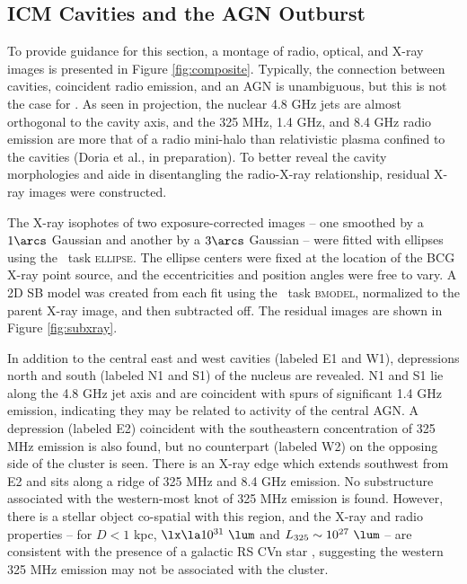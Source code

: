 \documentclass{emulateapj}
\begin{document}
\subsection{ICM Cavities and the AGN Outburst}
\label{sec:cavities}

To provide guidance for this section, a montage of radio, optical, and
X-ray images is presented in Figure \ref{fig:composite}. Typically,
the connection between cavities, coincident radio emission, and an AGN
is unambiguous, but this is not the case for \rxj. As seen in
projection, the nuclear 4.8 GHz jets are almost orthogonal to the
cavity axis, and the 325 MHz, 1.4 GHz, and 8.4 GHz radio emission are
more that of a radio mini-halo than relativistic plasma confined to
the cavities (Doria et al., in preparation). To better reveal the
cavity morphologies and aide in disentangling the radio-X-ray
relationship, residual X-ray images were constructed.

The X-ray isophotes of two exposure-corrected images -- one smoothed
by a $1\arcs$ Gaussian and another by a $3\arcs$ Gaussian -- were
fitted with ellipses using the \iraf\ task \textsc{ellipse}. The
ellipse centers were fixed at the location of the BCG X-ray point
source, and the eccentricities and position angles were free to
vary. A 2D SB model was created from each fit using the \iraf\ task
\textsc{bmodel}, normalized to the parent X-ray image, and then
subtracted off. The residual images are shown in Figure
\ref{fig:subxray}.

In addition to the central east and west cavities (labeled E1 and W1),
depressions north and south (labeled N1 and S1) of the nucleus are
revealed. N1 and S1 lie along the 4.8 GHz jet axis and are coincident
with spurs of significant 1.4 GHz emission, indicating they may be
related to activity of the central AGN. A depression (labeled E2)
coincident with the southeastern concentration of 325 MHz emission is
also found, but no counterpart (labeled W2) on the opposing side of
the cluster is seen. There is an X-ray edge which extends southwest
from E2 and sits along a ridge of 325 MHz and 8.4 GHz emission. No
substructure associated with the western-most knot of 325 MHz emission
is found. However, there is a stellar object co-spatial with this
region, and the X-ray and radio properties -- for $D < 1$ kpc, $\lx
\la 10^{31} ~\lum$ and $L_{325} \sim 10^{27} ~\lum$ -- are consistent
with the presence of a galactic RS CVn star
\citep{1993RPPh...56.1145S}, suggesting the western 325 MHz emission
may not be associated with the cluster.
\end{document}
